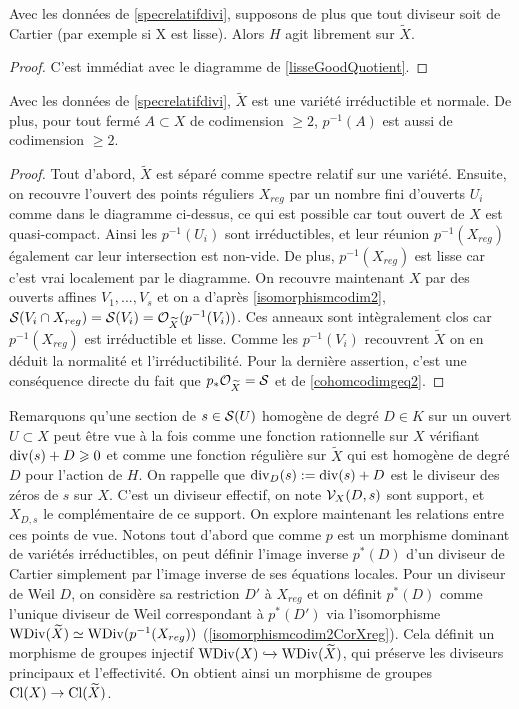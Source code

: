 \begin{prop}
Avec les données de \ref{specrelatifdivi}, supposons de plus que tout diviseur soit de Cartier (par exemple si X est lisse). Alors $H$ agit librement sur $\widetilde{X}$.
\end{prop}
\begin{proof}
C'est immédiat avec le diagramme de \ref{lisseGoodQuotient}.
\end{proof}


\begin{prop}\label{preimagecodim2}
Avec les données de \ref{specrelatifdivi}, $\widetilde{X}$ est une variété irréductible et normale. De plus, pour tout fermé $A\subset X$ de codimension $\geq 2$, $p^{-1}(A)$ est aussi de codimension $\geq 2$.
\end{prop}
\begin{proof}
Tout d'abord, $\widetilde{X}$ est séparé comme spectre relatif sur une variété. Ensuite, on recouvre l'ouvert des points réguliers $X_{reg}$ par un nombre fini d'ouverts $U_i$ comme dans le diagramme ci-dessus, ce qui est possible car tout ouvert de $X$ est quasi-compact. Ainsi les $p^{-1}(U_i)$ sont irréductibles, et leur réunion $p^{-1}(X_{reg})$ également car leur intersection est non-vide. De plus, $p^{-1}(X_{reg})$ est lisse car c'est vrai localement par le diagramme. On recouvre maintenant $X$ par des ouverts affines $V_1,...,V_s$ et on a d'après \ref{isomorphismcodim2}, $\mathcal{S}(V_i\cap X_{reg})=\mathcal{S}(V_i)=\mathcal{O}_{\widetilde{X}}(p^{-1}(V_i))$. Ces anneaux sont intègralement clos car $p^{-1}(X_{reg})$ est irréductible et lisse. Comme les $p^{-1}(V_i)$ recouvrent $\widetilde{X}$ on en déduit la normalité et l'irréductibilité.
Pour la dernière assertion, c'est une conséquence directe du fait que $p_*\mathcal{O}_{\widetilde{X}}=\mathcal{S}$ et de \ref{cohomcodimgeq2}.
\end{proof}

Remarquons qu'une section de $s\in \mathcal{S}(U)$ homogène de degré $D\in K$ sur un ouvert $U\subset X$ peut être vue à la fois comme une fonction rationnelle sur $X$ vérifiant $\operatorname{div}(s)+D\geqslant 0$ et comme une fonction régulière sur $\widetilde{X}$ qui est homogène de degré $D$ pour l'action de $H$. On rappelle que $\operatorname{div}_D(s):=\operatorname{div}(s)+D$ est le diviseur des zéros de $s$ sur $X$. C'est un diviseur effectif, on note $\mathcal{V}_X(D,s)$ sont support, et $X_{D,s}$ le complémentaire de ce support. On explore maintenant les relations entre ces points de vue. Notons tout d'abord que comme $p$ est un morphisme dominant de variétés irréductibles, on peut définir l'image inverse $p^*(D)$ d'un diviseur de Cartier simplement par l'image inverse de ses équations locales. Pour un diviseur de Weil $D$, on considère sa restriction $D'$ à $X_{reg}$ et on définit $p^*(D)$ comme l'unique diviseur de Weil correspondant à $p^*(D')$ via l'isomorphisme $\operatorname{WDiv}(\widetilde{X})\simeq\operatorname{WDiv}(p^{-1}(X_{reg}))$ (\ref{isomorphismcodim2CorXreg}). Cela définit un morphisme de groupes injectif $\operatorname{WDiv}(X)\xhookrightarrow{}\operatorname{WDiv}(\widetilde{X})$, qui préserve les diviseurs principaux et l'effectivité. On obtient ainsi un morphisme de groupes $\operatorname{Cl}(X)\rightarrow \operatorname{Cl}(\widetilde{X})$.

